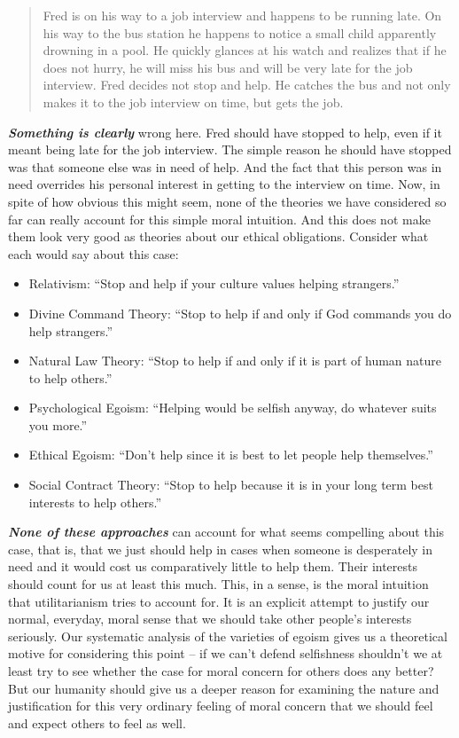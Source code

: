 \documentclass[
  12pt, openany]{book}
\providecommand{\tightlist}{%
  \setlength{\itemsep}{0pt}\setlength{\parskip}{0pt}}
\theoremstyle{definition}
\theoremstyle{definition}
\theoremstyle{definition}
\theoremstyle{remark}
\begin{document}
\begin{quote}
Fred is on his way to a job interview and happens to be running late. On his way to the bus station he happens to notice a small child apparently drowning in a pool. He quickly glances at his watch and realizes that if he does not hurry, he will miss his bus and will be very late for the job interview. Fred decides not stop and help. He catches the bus and not only makes it to the job interview on time, but gets the job.
\end{quote}

\textbf{\emph{Something is clearly}} wrong here. Fred should have stopped to help, even if it meant being late for the job interview. The simple reason he should have stopped was that someone else was in need of help. And the fact that this person was in need overrides his personal interest in getting to the interview on time. Now, in spite of how obvious this might seem, none of the theories we have considered so far can really account for this simple moral intuition. And this does not make them look very good as theories about our ethical obligations. Consider what each would say about this case:

\begin{itemize}
\tightlist
\item
  Relativism: ``Stop and help if your culture values helping strangers.''
\item
  Divine Command Theory: ``Stop to help if and only if God commands you do help strangers.''
\item
  Natural Law Theory: ``Stop to help if and only if it is part of human nature to help others.''
\item
  Psychological Egoism: ``Helping would be selfish anyway, do whatever suits you more.''
\item
  Ethical Egoism: ``Don't help since it is best to let people help themselves.''
\item
  Social Contract Theory: ``Stop to help because it is in your long term best interests to help others.''
\end{itemize}

\textbf{\emph{None of these approaches}} can account for what seems compelling about this case, that is, that we just should help in cases when someone is desperately in need and it would cost us comparatively little to help them. Their interests should count for us at least this much. This, in a sense, is the moral intuition that utilitarianism tries to account for. It is an explicit attempt to justify our normal, everyday, moral sense that we should take other people's interests seriously. Our systematic analysis of the varieties of egoism gives us a theoretical motive for considering this point -- if we can't defend selfishness shouldn't we at least try to see whether the case for moral concern for others does any better? But our humanity should give us a deeper reason for examining the nature and justification for this very ordinary feeling of moral concern that we should feel and expect others to feel as well.
\end{document}
